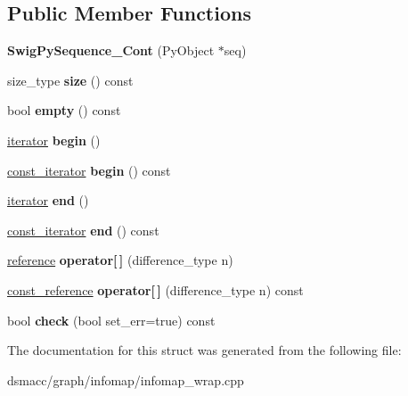 \subsection*{Public Member Functions}
\begin{DoxyCompactItemize}
\item 
\mbox{\label{structswig_1_1SwigPySequence__Cont_ab5d9afb935fb3e57c1f0cc41d652ad74}} 
{\bfseries Swig\+Py\+Sequence\+\_\+\+Cont} (Py\+Object $\ast$seq)
\item 
\mbox{\label{structswig_1_1SwigPySequence__Cont_a8c2d41c6dd056c7fa40a3c4606147e6b}} 
size\+\_\+type {\bfseries size} () const
\item 
\mbox{\label{structswig_1_1SwigPySequence__Cont_a57a9fc4c5cb2c2d752c052ee551bc468}} 
bool {\bfseries empty} () const
\item 
\mbox{\label{structswig_1_1SwigPySequence__Cont_a6c664b1e10c7f14f8b382e429a25bf18}} 
\mbox{\hyperlink{structswig_1_1SwigPySequence__InputIterator}{iterator}} {\bfseries begin} ()
\item 
\mbox{\label{structswig_1_1SwigPySequence__Cont_a63b34796bc977555647bed8dd4f50385}} 
\mbox{\hyperlink{structswig_1_1SwigPySequence__InputIterator}{const\+\_\+iterator}} {\bfseries begin} () const
\item 
\mbox{\label{structswig_1_1SwigPySequence__Cont_afcf903575db45b8119e5039597af9cbb}} 
\mbox{\hyperlink{structswig_1_1SwigPySequence__InputIterator}{iterator}} {\bfseries end} ()
\item 
\mbox{\label{structswig_1_1SwigPySequence__Cont_a4fe9d3c4879b4a97de2bd4b7d7b59c72}} 
\mbox{\hyperlink{structswig_1_1SwigPySequence__InputIterator}{const\+\_\+iterator}} {\bfseries end} () const
\item 
\mbox{\label{structswig_1_1SwigPySequence__Cont_a796a0c43a8a8af5a42f52994b6651960}} 
\mbox{\hyperlink{structswig_1_1SwigPySequence__Ref}{reference}} {\bfseries operator\mbox{[}$\,$\mbox{]}} (difference\+\_\+type n)
\item 
\mbox{\label{structswig_1_1SwigPySequence__Cont_a33b8b37c909c48bc894cd9b909d1e81d}} 
\mbox{\hyperlink{structswig_1_1SwigPySequence__Ref}{const\+\_\+reference}} {\bfseries operator\mbox{[}$\,$\mbox{]}} (difference\+\_\+type n) const
\item 
\mbox{\label{structswig_1_1SwigPySequence__Cont_adde81d1400800d54b6a8cd0afd234438}} 
bool {\bfseries check} (bool set\+\_\+err=true) const
\end{DoxyCompactItemize}


The documentation for this struct was generated from the following file\+:\begin{DoxyCompactItemize}
\item 
dsmacc/graph/infomap/infomap\+\_\+wrap.\+cpp\end{DoxyCompactItemize}
